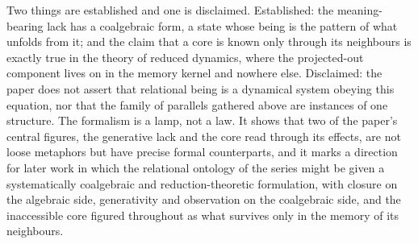 Two things are established and one is disclaimed. Established: the meaning-bearing lack has a coalgebraic form, a state whose being is the pattern of what unfolds from it; and the claim that a core is known only through its neighbours is exactly true in the theory of reduced dynamics, where the projected-out component lives on in the memory kernel and nowhere else. Disclaimed: the paper does not assert that relational being is a dynamical system obeying this equation, nor that the family of parallels gathered above are instances of one structure. The formalism is a lamp, not a law. It shows that two of the paper's central figures, the generative lack and the core read through its effects, are not loose metaphors but have precise formal counterparts, and it marks a direction for later work in which the relational ontology of the series might be given a systematically coalgebraic and reduction-theoretic formulation, with closure on the algebraic side, generativity and observation on the coalgebraic side, and the inaccessible core figured throughout as what survives only in the memory of its neighbours.

